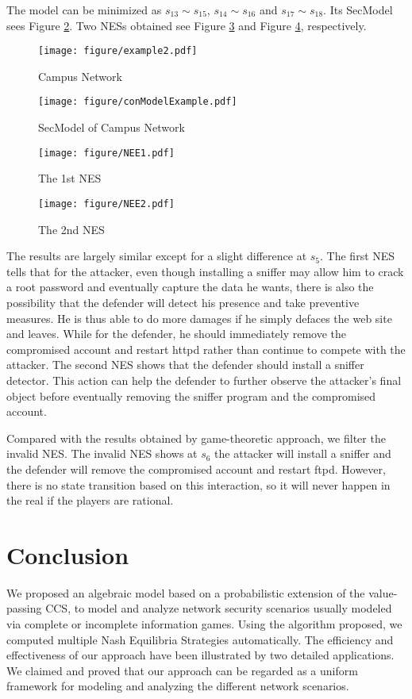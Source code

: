 \documentclass[10pt, conference, compsocconf]{IEEEtran}
\begin{document}
The model can be minimized as $s_{13}\sim s_{15}$, $s_{14}\sim s_{16}$ and $s_{17}\sim s_{18}$. Its SecModel sees Figure \ref{ComModelcasestudy}.
Two NESs obtained see Figure \ref{nash1} and Figure \ref{nash2}, respectively.
\begin{figure}[h]
\centering
\texttt{[image: figure/example2.pdf]}
\caption{Campus Network}
\label{example1}
\end{figure}
\begin{figure}[h]
\centering
\texttt{[image: figure/conModelExample.pdf]}
\caption{SecModel of Campus Network}
\label{ComModelcasestudy}
\end{figure}
\begin{figure}[h]
\centering
\texttt{[image: figure/NEE1.pdf]}
\caption{The 1st NES}
\label{nash1}
\end{figure}
\begin{figure}[h!t]
\centering
\texttt{[image: figure/NEE2.pdf]}
\caption{The 2nd NES }
\label{nash2}
\end{figure}

The results are largely similar except for a slight difference at $s_{5}$. The first NES tells that for the attacker, even though installing a sniffer may allow him to crack a root password and eventually capture the data he wants, there is also the possibility that the defender will detect his presence and take preventive measures.
He is thus able to do more damages if he simply defaces the web site and leaves.
While for the defender, he should immediately remove the compromised account and restart httpd rather than continue to compete with the attacker.
The second NES shows that the defender should install a sniffer detector. This action can help the defender to further observe the attacker's final object before eventually removing the sniffer program and the compromised account.

Compared with the results obtained by game-theoretic approach\cite{klye}, we filter the invalid NES.
The invalid NES shows at $s_6$ the attacker will install a sniffer and the defender will remove the compromised account and restart ftpd.
However, there is no state transition based on this interaction, so it will never happen in the real if the players are rational.


\section{Conclusion}
We proposed an algebraic model based on a probabilistic extension of the  value-passing CCS, to model and analyze network security scenarios usually modeled via complete or incomplete information games.
Using the algorithm proposed, we computed multiple Nash Equilibria Strategies automatically.
The efficiency and effectiveness of our approach have been illustrated by two detailed applications.
We claimed and proved that our approach can be regarded as a uniform framework for modeling and analyzing the different network scenarios.
\end{document}
